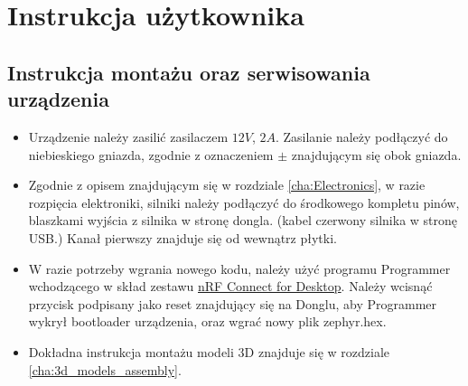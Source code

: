 \chapter{Instrukcja użytkownika}
\section{Instrukcja montażu oraz serwisowania urządzenia}
\begin{itemize}
    \item Urządzenie należy zasilić zasilaczem $12V$, $2A$. Zasilanie należy podłączyć do niebieskiego gniazda, zgodnie z oznaczeniem $\pm$ znajdującym się obok gniazda.
    \item Zgodnie z opisem znajdującym się w rozdziale \ref{cha:Electronics}, w razie rozpięcia elektroniki, silniki należy podłączyć do środkowego kompletu pinów, blaszkami wyjścia z silnika w stronę dongla. (kabel czerwony silnika w stronę USB.) Kanał pierwszy znajduje się od wewnątrz płytki.
    \item W razie potrzeby wgrania nowego kodu, należy użyć programu Programmer wchodzącego w skład zestawu
    \href{https://www.nordicsemi.com/Products/Development-tools/nRF-Connect-for-Desktop}{nRF Connect for Desktop}. Należy wcisnąć przycisk podpisany jako reset znajdujący się na Donglu, aby Programmer wykrył bootloader urządzenia, oraz wgrać nowy plik zephyr.hex.
    \item Dokładna instrukcja montażu modeli 3D znajduje się w rozdziale \ref{cha:3d_models_assembly}.
\end{itemize}
